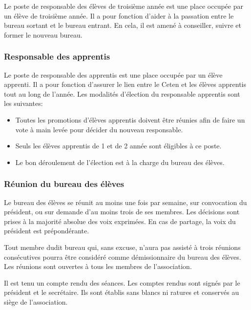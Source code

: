 \documentclass{article} %
\begin{document}
				Le poste de responsable des élèves de troisième année est une
				place occupée par un élève de troisième année. Il a pour
				fonction d’aider à la passation entre le bureau sortant et le
				bureau entrant. En cela, il est amené à conseiller, suivre et
				former le nouveau bureau.

			\subsubsection{Responsable des apprentis}
\label{ssub:responsable_des_apprentis}

				Le poste de responsable des apprentis est une place occupée par
				un élève apprenti. Il a pour fonction d’assurer le lien entre le
				Ceten et les élèves apprentis tout au long de l’année. Les
				modalités d’élection du responsable apprentis sont les
				suivantes:
				\begin{itemize}
					\item Toutes les promotions d’élèves apprentis doivent être
						réunies afin de faire un vote à main levée pour décider
						du nouveau responsable.
					\item Seuls les élèves apprentis de 1 et de
						2 année sont éligibles à ce poste.
					\item Le bon déroulement de l’élection est à la charge du
						bureau des élèves.
				\end{itemize}

			\subsubsection{Réunion du bureau des élèves}
\label{ssub:reunion_du_bureau_des_eleves}

				Le bureau des élèves se réunit au moins une fois par semaine,
				sur convocation du président, ou sur demande d'au moins trois de
				ses membres. Les décisions sont prises à la majorité absolue des
				voix exprimées. En cas de partage, la voix du président est
				prépondérante. 

				Tout membre dudit bureau qui, sans excuse, n’aura pas assisté à
				trois réunions consécutives pourra être considéré comme
				démissionnaire du bureau des élèves. Les réunions sont ouvertes
				à tous les membres de l’association.

				Il est tenu un compte rendu des séances. Les comptes rendus sont
				signés par le président et le secrétaire. Ils sont établis sans
				blancs ni ratures et conservés au siège de l’association.
\end{document}
